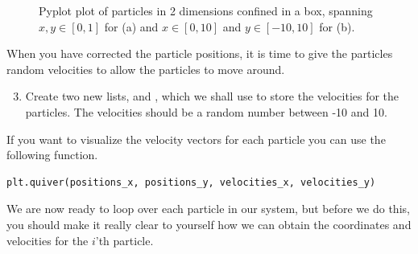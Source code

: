 \documentclass{article}
\begin{document}
\begin{figure}[htb]
  \centering
  \caption{
    Pyplot plot of particles in 2 dimensions confined in a box, spanning $x, y \in [0,1]$ for (a) and $x \in [0,10]$ and $y \in [-10,10]$ for (b).
  }
\end{figure}


\newpage

When you have corrected the particle positions, it is time to give the particles random velocities to allow the particles to move around.

\begin{enumerate}
  \setcounter{enumi}{2}
  \item Create
    two new lists,  and , which we shall use to
    store the velocities for the particles.
    The velocities should be a random number between -10 and 10.
\end{enumerate}

If you want to visualize the velocity vectors for each particle you can use the following function.\\

\begin{lstlisting}
plt.quiver(positions_x, positions_y, velocities_x, velocities_y)
\end{lstlisting}

We are now ready to loop over each particle in our system, but before we do this, you should make it really clear to yourself how we can obtain the coordinates and velocities for the $i$'th particle.
\end{document}
